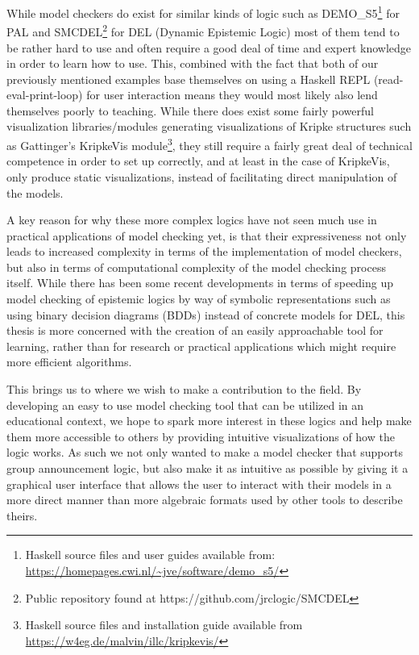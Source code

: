 While model checkers do exist for similar kinds of logic such as DEMO\_S5\footnote{Haskell source files and user guides available from: \url{https://homepages.cwi.nl/~jve/software/demo_s5/}} for PAL and SMCDEL\footnote{Public repository found at https://github.com/jrclogic/SMCDEL}\cite{GattingerSMCDELPhD} for DEL (Dynamic Epistemic Logic) most of them tend to be rather hard to use and often require a good deal of time and expert knowledge in order to learn how to use. This, combined with the fact that both of our previously mentioned examples base themselves on using a Haskell REPL (read-eval-print-loop) for user interaction means  they would most likely also lend themselves poorly to teaching. While there does exist some fairly powerful visualization libraries/modules generating visualizations of Kripke structures such as Gattinger's KripkeVis module\footnote{Haskell source files and installation guide available from \url{https://w4eg.de/malvin/illc/kripkevis/}}, they still require a fairly great deal of technical competence in order to set up correctly, and at least in the case of KripkeVis, only produce static visualizations, instead of facilitating direct manipulation of the models.

A key reason for why these more complex logics have not seen much use in practical applications of model checking yet, is that their expressiveness not only leads to increased complexity in terms of the implementation of model checkers, but also in terms of computational complexity of the model checking process itself. While there has been some recent developments in terms of speeding up model checking of epistemic logics by way of symbolic representations such as using binary decision diagrams\cite{BDDs} (BDDs) instead of concrete models for DEL\cite{GattingerSMCDELPhD}, this thesis is more concerned with the creation of an easily approachable tool for learning, rather than for research or practical applications which might require more efficient algorithms.


This brings us to where we wish to make a contribution to the field. By developing an easy to use model checking tool that can be utilized in an educational context, we hope to spark more interest in these logics and help make them more accessible to others by providing intuitive visualizations of how the logic works. As such we not only wanted to make a model checker that supports group announcement logic, but also make it as intuitive as possible by giving it a graphical user interface that allows the user to interact with their models in a more direct manner than more algebraic formats used by other tools to describe theirs. 

